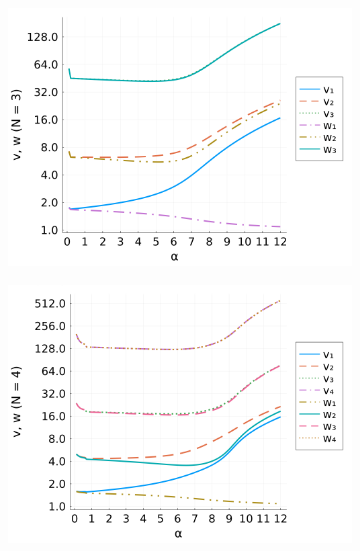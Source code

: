 \begin{figure}[!tbp]
  \begin{subfigure}[b]{0.49\textwidth}
    \centering
    \includegraphics[width=\textwidth]{figures/vw_N3.png}
  \end{subfigure}
  \hfill
  \begin{subfigure}[b]{0.49\textwidth}
    \centering
    \includegraphics[width=\textwidth]{figures/vw_N4.png}
  \end{subfigure}
  \begin{subfigure}[b]{0.49\textwidth}
    \centering

\end{subfigure}
\end{figure}
